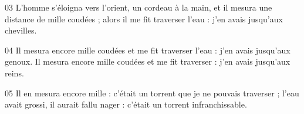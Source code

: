 
03 L’homme s’éloigna vers l’orient, un cordeau à la main, et il mesura une distance de mille coudées ; alors il me fit traverser l’eau : j’en avais jusqu’aux chevilles.

04 Il mesura encore mille coudées et me fit traverser l’eau : j’en avais jusqu’aux genoux. Il mesura encore mille coudées et me fit traverser : j’en avais jusqu’aux reins.

05 Il en mesura encore mille : c’était un torrent que je ne pouvais traverser ; l’eau avait grossi, il aurait fallu nager : c’était un torrent infranchissable.
